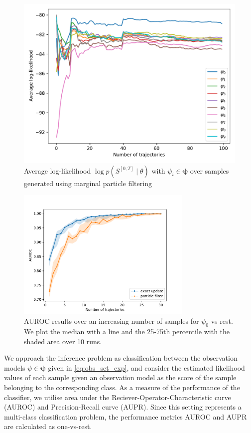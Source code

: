 \begin{figure}[H]
	\begin{center}
		\includegraphics[width=.7\textwidth]{figures/roc_analysis/roc_particleFilter/llh_particleFilter_psi_0}
		\caption[Average log-likelihood in the case of marginal particle filtering]{Average log-likelihood $ \log p(S^{[0,T]} \mid \theta) $ with $ \psi_i \in \boldsymbol{\psi} $ over samples generated using marginal particle filtering}
		\label{fig:llh_particle}
	\end{center}
\end{figure}
\pagebreak
\begin{figure}[t]
	\begin{center}
		\includegraphics[width=0.75\textwidth]{figures/roc_analysis/AUROC_perc_0}
		\caption[AUROC results over an increasing number of samples]{AUROC results over an increasing number of samples for $ \psi_0 $-vs-rest. We plot the median with a line and the 25-75th percentile with the shaded area over 10 runs.}
		\label{fig:AUROC_class0}
	\end{center}
\end{figure}
We approach the inference problem as classification between the observation models $ \psi \in \boldsymbol{\psi} $ given in \cref{eq:obs_set_exp}, and consider the estimated likelihood values of each sample given an observation model as the score of the sample belonging to the corresponding class. As a measure of the performance of the classifier, we utilise area under the Reciever-Operator-Characteristic curve (AUROC) and Precision-Recall curve (AUPR). Since this setting represents a multi-class classification problem, the performance metrics AUROC and AUPR are calculated as one-vs-rest. \par 
